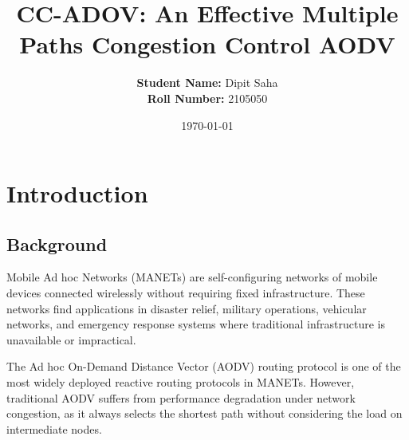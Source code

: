 \documentclass[12pt,a4paper]{article}
\title{\textbf{CC-ADOV: An Effective Multiple Paths Congestion Control AODV 
}}
\author{
    \textbf{Student Name:} Dipit Saha \\
    \textbf{Roll Number:} 2105050 
}
\date{\today}
\begin{document}
\maketitle


\newpage
\tableofcontents
\newpage

\section{Introduction}

\subsection{Background}
Mobile Ad hoc Networks (MANETs) are self-configuring networks of mobile devices connected wirelessly without requiring fixed infrastructure. These networks find applications in disaster relief, military operations, vehicular networks, and emergency response systems where traditional infrastructure is unavailable or impractical.

The Ad hoc On-Demand Distance Vector (AODV) routing protocol is one of the most widely deployed reactive routing protocols in MANETs. However, traditional AODV suffers from performance degradation under network congestion, as it always selects the shortest path without considering the load on intermediate nodes.
\end{document}
